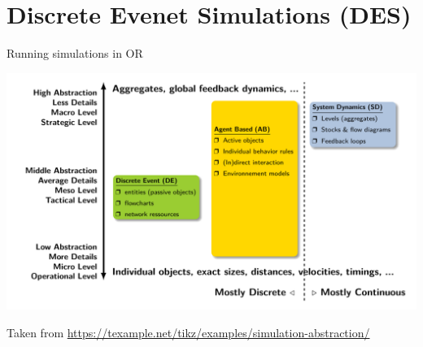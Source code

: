 \documentclass[c]{beamer}
\begin{document}
\section{Discrete Evenet Simulations (DES)}
\begin{frame}{Running simulations in OR}
  \begin{center}
    \includegraphics[width=0.7\linewidth]{../figures/simulation.pdf}
  \end{center}
  Taken from \url{https://texample.net/tikz/examples/simulation-abstraction/}
\end{frame}


\end{document}
